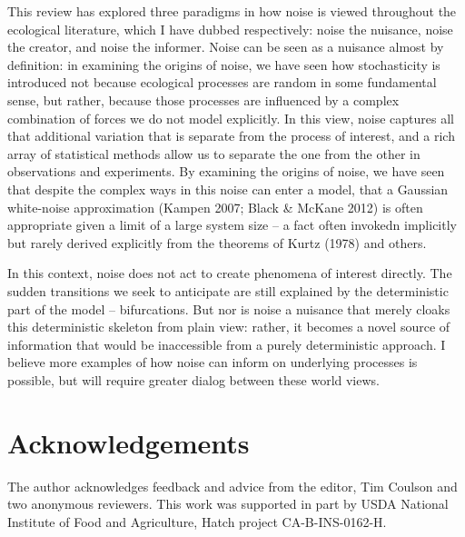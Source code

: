 \documentclass[
  authoryear,
  preprint,
  3p]{elsarticle}
\begin{document}
This review has explored three paradigms in how noise is viewed
throughout the ecological literature, which I have dubbed respectively:
noise the nuisance, noise the creator, and noise the informer. Noise can
be seen as a nuisance almost by definition: in examining the origins of
noise, we have seen how stochasticity is introduced not because
ecological processes are random in some fundamental sense, but rather,
because those processes are influenced by a complex combination of
forces we do not model explicitly. In this view, noise captures all that
additional variation that is separate from the process of interest, and
a rich array of statistical methods allow us to separate the one from
the other in observations and experiments. By examining the origins of
noise, we have seen that despite the complex ways in this noise can
enter a model, that a Gaussian white-noise approximation (Kampen 2007;
Black \& McKane 2012) is often appropriate given a limit of a large
system size -- a fact often invokedn implicitly but rarely derived
explicitly from the theorems of Kurtz (1978) and others.

In this context, noise does not act to create phenomena of interest
directly. The sudden transitions we seek to anticipate are still
explained by the deterministic part of the model -- bifurcations. But
nor is noise a nuisance that merely cloaks this deterministic skeleton
from plain view: rather, it becomes a novel source of information that
would be inaccessible from a purely deterministic approach. I believe
more examples of how noise can inform on underlying processes is
possible, but will require greater dialog between these world views.

\section{Acknowledgements}\label{acknowledgements}

The author acknowledges feedback and advice from the editor, Tim Coulson
and two anonymous reviewers. This work was supported in part by USDA
National Institute of Food and Agriculture, Hatch project
CA-B-INS-0162-H.


\renewcommand\refname{References}

\end{document}
